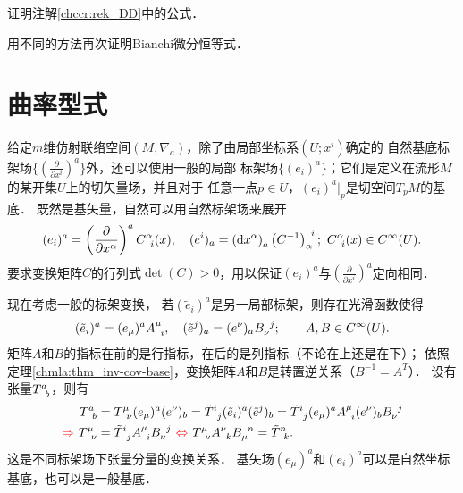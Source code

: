 \begin{exercise}
	证明注解\ref{chccr:rek_DD}中的公式．
\end{exercise}


\begin{exercise}
	用不同的方法再次证明Bianchi微分恒等式．
\end{exercise}


\section{曲率型式}\label{chccr:sec_form1}
给定$m$维仿射联络空间$(M,\nabla_a)$，除了由局部坐标系$(U;x^i)$确定的
自然基底标架场$\{(\frac{\partial}{\partial x^i})^a\}$外，还可以使用一般的局部
标架场$\{(e_i)^a\}$；它们是定义在流形$M$的某开集$U$上的切矢量场，并且对于
任意一点$p\in U$，$(e_i)^a|_p$是切空间$T_p M$的基底．
既然是基矢量，自然可以用自然标架场来展开
\begin{align}\label{chccr:eqn_natural-base_change}
    ({e} _i)^a = \left(\frac{\partial}{\partial x^\alpha}\right)^a C_{\hphantom{a} i}^{\alpha}(x) , \quad
    ({e} ^i)_a = \left({\rm d} x^\alpha \right)_a \left(C^{-1}\right)^{\hphantom{a} i}_{\alpha}   ;
    \ C_{\hphantom{a} i}^{\alpha}(x) \in C^{\infty}(U).
\end{align}
要求变换矩阵$C$的行列式$\det(C)>0$，用以保证$(e_i)^a$与$(\frac{\partial}{\partial x^i})^a$定向相同．



现在考虑一般的标架变换，
若$(\tilde{e}_i)^a$是另一局部标架，则存在光滑函数使得
\begin{align}\label{chccr:base_change}
    (\tilde{e} _i)^a = (e_\mu)^{a} A_{\hphantom{a} i}^{\mu} , \quad
    (\tilde{e} ^j)_a = (e^\nu)_{a} B^{\hphantom{a} j}_{\nu};
    \qquad A,B \in C^{\infty}(U) .
\end{align}
矩阵$A$和$B$的指标在前的是行指标，在后的是列指标（不论在上还是在下）；
依照定理\ref{chmla:thm_inv-cov-base}，变换矩阵$A$和$B$是转置逆关系（$B^{-1} = A^T$）．
设有张量$T^a _{\hphantom{a} b}$，则有
\begin{align}
    T^a _{\hphantom{a} b} &= T^{\mu} _{\hphantom{a} \nu}(e_\mu)^{a} (e^\nu)_{b}
    = \tilde{T}^{i} _{\hphantom{a} j} (\tilde{e} _i)^a (\tilde{e} ^j)_b
    = \tilde{T}^{i} _{\hphantom{a} j} (e_\mu)^{a} A_{\hphantom{a} i}^{\mu} (e^\nu)_{b} B^{\hphantom{a} j}_{\nu}
    \notag \\ {\color{red}\Rightarrow \ }
    T^{\mu} _{\hphantom{a} \nu} &= \tilde{T}^{i} _{\hphantom{a} j} A_{\hphantom{a} i}^{\mu} B^{\hphantom{a} j}_{\nu}
    {\ \color{red}\Leftrightarrow\ }
    T^{\mu} _{\hphantom{a} \nu} A_{\hphantom{a} k}^{\nu}  B^{\hphantom{a} n}_{\mu} = \tilde{T}^{n} _{\hphantom{a} k} .
\end{align}
这是不同标架场下张量分量的变换关系．
基矢场$(e_\mu)^{a}$和$(\tilde{e} _i)^a$可以是自然坐标基底，也可以是一般基底．


